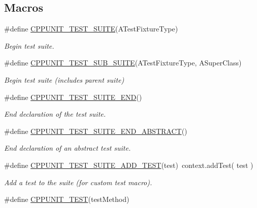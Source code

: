 \subsection*{Macros}
\begin{DoxyCompactItemize}
\item 
\#define \hyperlink{group___writing_test_fixture_gabe1e12200f40d6f25d60c1783c99da81}{C\-P\-P\-U\-N\-I\-T\-\_\-\-T\-E\-S\-T\-\_\-\-S\-U\-I\-T\-E}(A\-Test\-Fixture\-Type)
\begin{DoxyCompactList}\small\item\em Begin test suite. \end{DoxyCompactList}\item 
\#define \hyperlink{group___writing_test_fixture_gae19f30ade82172cf6c3ff297367a10c2}{C\-P\-P\-U\-N\-I\-T\-\_\-\-T\-E\-S\-T\-\_\-\-S\-U\-B\-\_\-\-S\-U\-I\-T\-E}(A\-Test\-Fixture\-Type, A\-Super\-Class)
\begin{DoxyCompactList}\small\item\em Begin test suite (includes parent suite) \end{DoxyCompactList}\item 
\#define \hyperlink{group___writing_test_fixture_ga601b2e1d525f3947b216e28c625abcb1}{C\-P\-P\-U\-N\-I\-T\-\_\-\-T\-E\-S\-T\-\_\-\-S\-U\-I\-T\-E\-\_\-\-E\-N\-D}()
\begin{DoxyCompactList}\small\item\em End declaration of the test suite. \end{DoxyCompactList}\item 
\#define \hyperlink{group___writing_test_fixture_gadcb50ede05c9da831bd8b0140fb59094}{C\-P\-P\-U\-N\-I\-T\-\_\-\-T\-E\-S\-T\-\_\-\-S\-U\-I\-T\-E\-\_\-\-E\-N\-D\-\_\-\-A\-B\-S\-T\-R\-A\-C\-T}()
\begin{DoxyCompactList}\small\item\em End declaration of an abstract test suite. \end{DoxyCompactList}\item 
\#define \hyperlink{group___writing_test_fixture_gaace55a4a3a4f3e0cd219d38e98d4f48f}{C\-P\-P\-U\-N\-I\-T\-\_\-\-T\-E\-S\-T\-\_\-\-S\-U\-I\-T\-E\-\_\-\-A\-D\-D\-\_\-\-T\-E\-S\-T}(test)~context.\-add\-Test( test )
\begin{DoxyCompactList}\small\item\em Add a test to the suite (for custom test macro). \end{DoxyCompactList}\item 
\#define \hyperlink{group___writing_test_fixture_gaac9b03d898b207e1daf2f93867935a96}{C\-P\-P\-U\-N\-I\-T\-\_\-\-T\-E\-S\-T}(test\-Method)

\end{DoxyCompactItemize}
